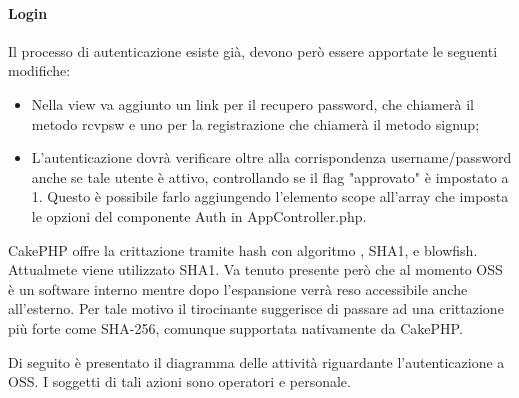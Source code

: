 \paragraph{Login}

Il processo di autenticazione esiste già, devono però essere apportate le seguenti modifiche:
\begin{itemize}
\item Nella view va aggiunto un link per il recupero password, che chiamerà il metodo rcvpsw e uno per la registrazione che chiamerà il metodo signup;
\item L'autenticazione dovrà verificare oltre alla corrispondenza username/password anche se tale utente è attivo, controllando se il flag "approvato" è impostato a 1. Questo è possibile farlo aggiungendo l'elemento scope all'array che imposta le opzioni del componente Auth in AppController.php.
\end{itemize}

\label{hash} CakePHP offre la crittazione tramite hash con algoritmo , SHA1,  e blowfish. Attualmete viene utilizzato SHA1. Va tenuto presente però che al momento OSS è un software interno mentre dopo l'espansione verrà reso accessibile anche all'esterno. Per tale motivo il tirocinante suggerisce di passare ad una crittazione più forte come SHA-256, comunque supportata nativamente da CakePHP.


Di seguito è presentato il diagramma delle attività riguardante l'autenticazione a OSS. I soggetti di tali azioni sono operatori e personale.\\

